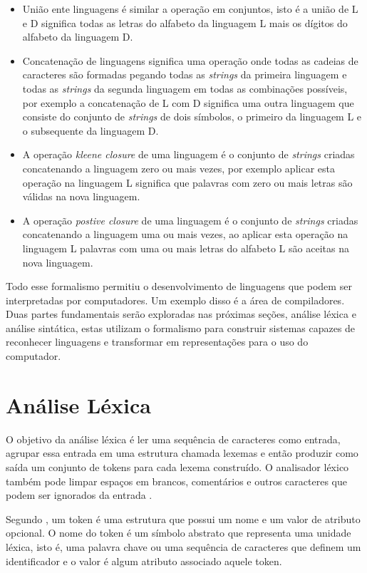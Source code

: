 \begin{itemize} 
    \item União ente linguagens é similar a operação em conjuntos, isto é a união de L e D significa
    todas as letras do alfabeto da linguagem L mais os dígitos do alfabeto da linguagem D.
    \item Concatenação de linguagens significa uma operação onde todas as cadeias de caracteres são
    formadas pegando todas as \textit{strings} da primeira linguagem e todas as \textit{strings} 
    da segunda linguagem em todas as combinações possíveis, por exemplo a concatenação de L com D
    significa uma outra linguagem que consiste do conjunto de \textit{strings} de dois símbolos, o primeiro
    da linguagem L e o subsequente da linguagem D.
    \item A operação \textit{kleene closure} de uma linguagem é o conjunto de \textit{strings} criadas concatenando a linguagem zero 
    ou mais vezes, por exemplo aplicar esta operação na linguagem L significa que palavras com zero ou mais letras
    são válidas na nova linguagem.
    \item A operação \textit{postive closure} de uma linguagem é o conjunto de \textit{strings} criadas concatenando a linguagem uma 
    ou mais vezes, ao aplicar esta operação na linguagem L palavras com uma ou mais letras do alfabeto L são aceitas
    na nova linguagem.
\end{itemize}

Todo esse formalismo permitiu o desenvolvimento de linguagens que podem ser interpretadas por computadores.
Um exemplo disso é a área de compiladores. Duas partes fundamentais serão exploradas nas próximas
seções, análise léxica e análise sintática, estas utilizam o formalismo para construir sistemas capazes 
de reconhecer linguagens e transformar em representações para o uso do computador.

\section{Análise Léxica}

O objetivo da análise léxica é ler uma sequência de caracteres como entrada, agrupar essa entrada em 
uma estrutura chamada lexemas e então produzir como saída um conjunto de 
tokens para cada lexema construído. O analisador léxico também pode limpar espaços 
em brancos, comentários e outros caracteres que podem ser ignorados da entrada \cite{aho2006}.

Segundo , um token é uma estrutura que possui um nome e um valor de atributo opcional.
O nome do token é um símbolo abstrato que representa uma unidade léxica, isto é, uma  palavra chave ou
uma sequência de caracteres que definem um identificador e o valor é algum atributo associado aquele token.

